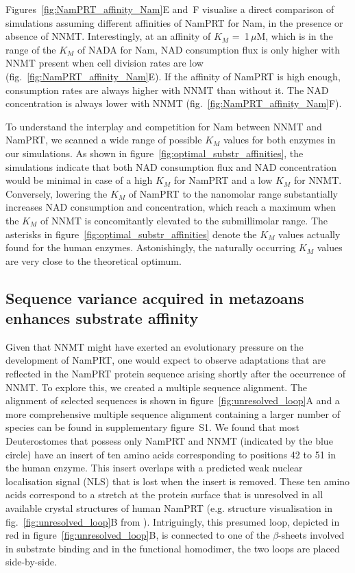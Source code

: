 Figures~\ref{fig:NamPRT_affinity_Nam}E and~F visualise a direct comparison of simulations assuming different affinities of NamPRT for Nam, in the presence or absence of NNMT. Interestingly, at an affinity of $K_{M}$ =~1\,$\mu$M, which is in the range of the $K_{M}$ of NADA for Nam, NAD consumption flux is only higher with NNMT present when cell division rates are low (fig.~\ref{fig:NamPRT_affinity_Nam}E). If the affinity of NamPRT is high enough, consumption rates are always higher with NNMT than without it. The NAD concentration is always lower with NNMT (fig.~\ref{fig:NamPRT_affinity_Nam}F).

To understand the interplay and competition for Nam between NNMT and NamPRT, we scanned a wide range of possible $K_{M}$ values for both enzymes in our simulations. As shown in figure~\ref{fig:optimal_substr_affinities}, the simulations indicate that both NAD consumption flux and NAD concentration would be minimal in case of a high $K_{M}$ for NamPRT and a low $K_{M}$ for NNMT. Conversely, lowering the $K_{M}$ of NamPRT to the nanomolar range substantially increases NAD consumption and concentration, which reach a maximum when the $K_{M}$ of NNMT is concomitantly elevated to the submillimolar range. The asterisks in figure~\ref{fig:optimal_substr_affinities} denote the $K_{M}$ values actually found for the human enzymes. Astonishingly, the naturally occurring $K_{M}$ values are very close to the theoretical optimum.


\subsection{Sequence variance acquired in metazoans enhances substrate affinity}

Given that NNMT might have exerted an evolutionary pressure on the development of NamPRT, one would expect to observe adaptations that are reflected in the NamPRT protein sequence arising shortly after the occurrence of NNMT. To explore this, we created a multiple sequence alignment. The alignment of selected sequences is shown in figure~\ref{fig:unresolved_loop}A and a more comprehensive multiple sequence alignment containing a larger number of species can be found in supplementary figure~S1. We found that most Deuterostomes that possess only NamPRT and NNMT (indicated by the blue circle) have an insert of ten amino acids corresponding to positions 42 to 51 in the human enzyme. This insert overlaps with a predicted weak nuclear localisation signal (NLS) that is lost when the insert is removed. These ten amino acids correspond to a stretch at the protein surface that is unresolved in all available crystal structures of human NamPRT (e.g. structure visualisation in fig.~\ref{fig:unresolved_loop}B from \citet{Wang2006}). Intriguingly, this presumed loop, depicted in red in figure~\ref{fig:unresolved_loop}B, is connected to one of the $\beta$-sheets involved in substrate binding \citep{Burgos2009} and in the functional homodimer, the two loops are placed side-by-side.

